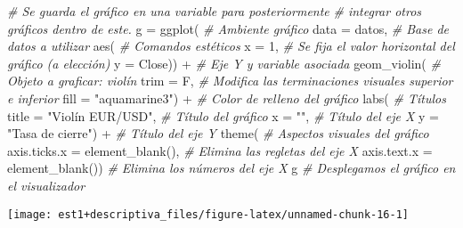 \documentclass[
]{book}
\newenvironment{Shaded}{\begin{snugshade}}{\end{snugshade}}
\newcommand{\AttributeTok}[1]{\textcolor[rgb]{0.77,0.63,0.00}{#1}}
\newcommand{\CommentTok}[1]{\textcolor[rgb]{0.56,0.35,0.01}{\textit{#1}}}
\newcommand{\DecValTok}[1]{\textcolor[rgb]{0.00,0.00,0.81}{#1}}
\newcommand{\FunctionTok}[1]{\textcolor[rgb]{0.00,0.00,0.00}{#1}}
\newcommand{\NormalTok}[1]{#1}
\newcommand{\OtherTok}[1]{\textcolor[rgb]{0.56,0.35,0.01}{#1}}
\newcommand{\SpecialCharTok}[1]{\textcolor[rgb]{0.00,0.00,0.00}{#1}}
\newcommand{\StringTok}[1]{\textcolor[rgb]{0.31,0.60,0.02}{#1}}
\begin{document}
\begin{Shaded}
\begin{Highlighting}[]
\CommentTok{\# Se guarda el gráfico en una variable para posteriormente}
\CommentTok{\# integrar otros gráficos dentro de este.}
\NormalTok{g }\OtherTok{=} \FunctionTok{ggplot}\NormalTok{( }\CommentTok{\# Ambiente gráfico}
  \AttributeTok{data =}\NormalTok{ datos, }\CommentTok{\# Base de datos a utilizar}
  \FunctionTok{aes}\NormalTok{( }\CommentTok{\# Comandos estéticos}
    \AttributeTok{x =} \DecValTok{1}\NormalTok{, }\CommentTok{\# Se fija el valor horizontal del gráfico (a elección)}
    \AttributeTok{y =}\NormalTok{ Close)) }\SpecialCharTok{+} \CommentTok{\# Eje Y y variable asociada}
  \FunctionTok{geom\_violin}\NormalTok{( }\CommentTok{\# Objeto a graficar: violín}
    \AttributeTok{trim =}\NormalTok{ F, }\CommentTok{\# Modifica las terminaciones visuales superior e inferior}
    \AttributeTok{fill =} \StringTok{"aquamarine3"}\NormalTok{) }\SpecialCharTok{+} \CommentTok{\# Color de relleno del gráfico}
  \FunctionTok{labs}\NormalTok{( }\CommentTok{\# Títulos}
    \AttributeTok{title =} \StringTok{"Violín EUR/USD"}\NormalTok{, }\CommentTok{\# Título del gráfico}
    \AttributeTok{x =} \StringTok{""}\NormalTok{, }\CommentTok{\# Título del eje X}
    \AttributeTok{y =} \StringTok{"Tasa de cierre"}\NormalTok{) }\SpecialCharTok{+} \CommentTok{\# Título del eje Y}
  \FunctionTok{theme}\NormalTok{( }\CommentTok{\# Aspectos visuales del gráfico}
    \AttributeTok{axis.ticks.x =} \FunctionTok{element\_blank}\NormalTok{(), }\CommentTok{\# Elimina las regletas del eje X}
    \AttributeTok{axis.text.x =} \FunctionTok{element\_blank}\NormalTok{()) }\CommentTok{\# Elimina los números del eje X}
\NormalTok{g }\CommentTok{\# Desplegamos el gráfico en el visualizador}
\end{Highlighting}
\end{Shaded}

\begin{center}\texttt{[image: est1+descriptiva\_files/figure-latex/unnamed-chunk-16-1]} \end{center}
\end{document}

